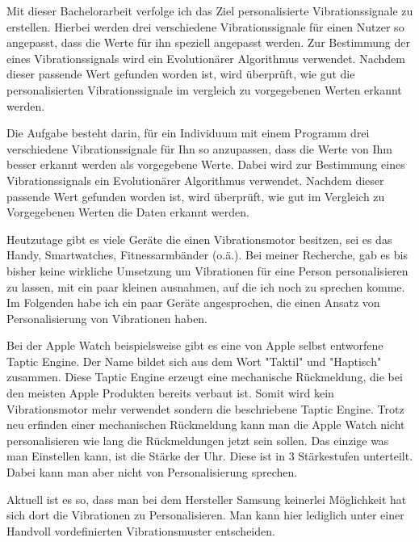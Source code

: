 

Mit dieser Bachelorarbeit verfolge ich das Ziel personalisierte Vibrationssignale zu erstellen. Hierbei werden drei verschiedene Vibrationssignale für einen Nutzer so angepasst, dass die Werte für ihn speziell angepasst werden. Zur Bestimmung der eines Vibrationssignals wird ein Evolutionärer Algorithmus verwendet. Nachdem dieser passende Wert gefunden worden ist, wird überprüft, wie gut die personalisierten Vibrationssignale im vergleich zu vorgegebenen Werten erkannt werden. 


Die Aufgabe besteht darin, für ein Individuum mit einem Programm drei verschiedene Vibrationssignale für Ihn so anzupassen, dass die Werte von Ihm besser erkannt werden als vorgegebene Werte. Dabei wird zur Bestimmung eines Vibrationssignals ein Evolutionärer Algorithmus verwendet. Nachdem dieser passende Wert gefunden worden ist, wird überprüft, wie gut im Vergleich zu Vorgegebenen Werten die Daten erkannt werden.

Heutzutage gibt es viele Geräte die einen Vibrationsmotor besitzen, sei es das Handy, Smartwatches, Fitnessarmbänder (o.ä.). Bei meiner Recherche, gab es bis bisher keine wirkliche Umsetzung um Vibrationen für eine Person personalisieren zu lassen, mit ein paar kleinen ausnahmen, auf die ich noch zu sprechen komme. Im Folgenden habe ich ein paar Geräte angesprochen, die einen Ansatz von Personalisierung von Vibrationen haben.

Bei der Apple Watch beispielsweise gibt es eine von Apple selbst entworfene Taptic Engine. Der Name bildet sich aus dem Wort "Taktil" und "Haptisch" zusammen. Diese Taptic Engine erzeugt eine mechanische Rückmeldung, die bei den meisten Apple Produkten bereits verbaut ist. Somit wird kein Vibrationsmotor mehr verwendet sondern die beschriebene Taptic Engine. Trotz neu erfinden einer mechanischen Rückmeldung kann man die Apple Watch nicht personalisieren wie lang die Rückmeldungen jetzt sein sollen. Das einzige was man Einstellen kann, ist die Stärke der Uhr. Diese ist in 3 Stärkestufen unterteilt. Dabei kann man aber nicht von Personalisierung sprechen. 

Aktuell ist es so, dass man bei dem Hersteller Samsung keinerlei Möglichkeit hat sich dort die Vibrationen zu Personalisieren. Man kann hier lediglich unter einer Handvoll vordefinierten Vibrationsmuster entscheiden. 

